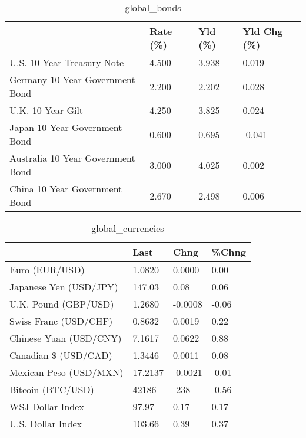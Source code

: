 \documentclass{article}%
\begin{document}
%


\begin{table}[htbp]%
\caption{global\_bonds}%
\centering%
\begin{adjustbox}{width=1\textwidth}%
\begin{tabular}{llll}
\toprule
                                  & Rate (\%) & Yld (\%) & Yld Chg (\%) \\
\midrule
       U.S. 10 Year Treasury Note &    4.500 &   3.938 &       0.019 \\
  Germany 10 Year Government Bond &    2.200 &   2.202 &       0.028 \\
                U.K. 10 Year Gilt &    4.250 &   3.825 &       0.024 \\
    Japan 10 Year Government Bond &    0.600 &   0.695 &      -0.041 \\
Australia 10 Year Government Bond &    3.000 &   4.025 &       0.002 \\
    China 10 Year Government Bond &    2.670 &   2.498 &       0.006 \\
\bottomrule
\end{tabular}
%
\end{adjustbox}%
\end{table}

%


\begin{table}[htbp]%
\caption{global\_currencies}%
\centering%
\begin{adjustbox}{width=1\textwidth}%
\begin{tabular}{llll}
\toprule
                       &    Last &    Chng & \%Chng \\
\midrule
        Euro (EUR/USD) &  1.0820 &  0.0000 &  0.00 \\
Japanese Yen (USD/JPY) &  147.03 &    0.08 &  0.06 \\
  U.K. Pound (GBP/USD) &  1.2680 & -0.0008 & -0.06 \\
 Swiss Franc (USD/CHF) &  0.8632 &  0.0019 &  0.22 \\
Chinese Yuan (USD/CNY) &  7.1617 &  0.0622 &  0.88 \\
  Canadian \$ (USD/CAD) &  1.3446 &  0.0011 &  0.08 \\
Mexican Peso (USD/MXN) & 17.2137 & -0.0021 & -0.01 \\
     Bitcoin (BTC/USD) &   42186 &    -238 & -0.56 \\
      WSJ Dollar Index &   97.97 &    0.17 &  0.17 \\
     U.S. Dollar Index &  103.66 &    0.39 &  0.37 \\
\bottomrule
\end{tabular}
%
\end{adjustbox}%
\end{table}
\end{document}
